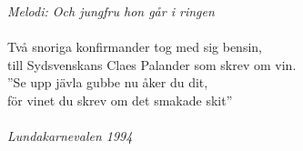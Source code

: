 {\footnotesize\textit{Melodi: Och jungfru hon går i ringen}}\\
\\
Två snoriga konfirmander tog med sig bensin,\\
till Sydsvenskans Claes Palander som skrev om vin.\\
”Se upp jävla gubbe nu åker du dit,\\
för vinet du skrev om det smakade skit”\\
\\
{\footnotesize\textit{Lundakarnevalen 1994}}
